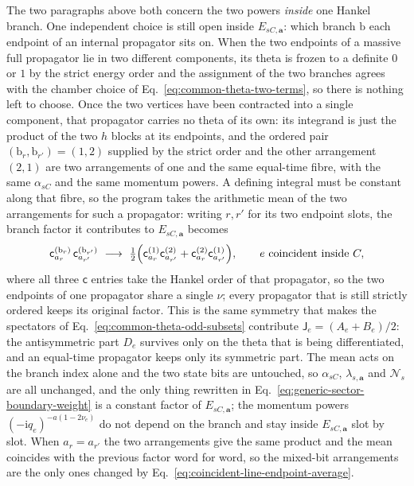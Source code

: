 \documentclass[11pt,a4paper]{article}
\newcommand{\ii}{\mathrm i}
\newcommand{\cN}{\mathcal N}
\begin{document}
The two paragraphs above both concern the two powers \emph{inside} one Hankel branch. One independent choice is still open inside $E_{sC,\bm a}$: which branch $\mathrm b$ each endpoint of an internal propagator sits on. When the two endpoints of a massive full propagator lie in two different components, its theta is frozen to a definite $0$ or $1$ by the strict energy order and the assignment of the two branches agrees with the chamber choice of Eq.~\eqref{eq:common-theta-two-terms}, so there is nothing left to choose. Once the two vertices have been contracted into a single component, that propagator carries no theta of its own: its integrand is just the product of the two $h$ blocks at its endpoints, and the ordered pair $(\mathrm b_r,\mathrm b_{r'})=(1,2)$ supplied by the strict order and the other arrangement $(2,1)$ are two arrangements of one and the same equal-time fibre, with the same $\alpha_{sC}$ and the same momentum powers. A defining integral must be constant along that fibre, so the program takes the arithmetic mean of the two arrangements for such a propagator: writing $r,r'$ for its two endpoint slots, the branch factor it contributes to $E_{sC,\bm a}$ becomes
\begin{equation}
 \mathsf c^{(\mathrm b_r)}_{a_r}\,\mathsf c^{(\mathrm b_{r'})}_{a_{r'}}
 \ \longrightarrow\
 \tfrac12\Bigl(\mathsf c^{(1)}_{a_r}\mathsf c^{(2)}_{a_{r'}}
 +\mathsf c^{(2)}_{a_r}\mathsf c^{(1)}_{a_{r'}}\Bigr),
 \qquad e\ \text{coincident inside }C,
 \label{eq:coincident-line-endpoint-average}
\end{equation}
where all three $\mathsf c$ entries take the Hankel order of that propagator, so the two endpoints of one propagator share a single $\nu$; every propagator that is still strictly ordered keeps its original factor. This is the same symmetry that makes the spectators of Eq.~\eqref{eq:common-theta-odd-subsets} contribute $\mathsf J_e=(A_e+B_e)/2$: the antisymmetric part $D_e$ survives only on the theta that is being differentiated, and an equal-time propagator keeps only its symmetric part. The mean acts on the branch index alone and the two state bits are untouched, so $\alpha_{sC}$, $\lambda_{s,\bm a}$ and $\cN_s$ are all unchanged, and the only thing rewritten in Eq.~\eqref{eq:generic-sector-boundary-weight} is a constant factor of $E_{sC,\bm a}$; the momentum powers $(-\ii q_e)^{-a(1-2\nu_e)}$ do not depend on the branch and stay inside $E_{sC,\bm a}$ slot by slot. When $a_r=a_{r'}$ the two arrangements give the same product and the mean coincides with the previous factor word for word, so the mixed-bit arrangements are the only ones changed by Eq.~\eqref{eq:coincident-line-endpoint-average}.
\end{document}
